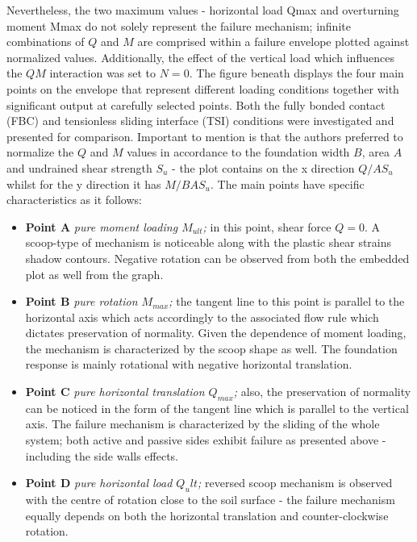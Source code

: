 \documentclass[10pt,a4paper]{report}
\begin{document}
Nevertheless, the two maximum values - horizontal load Qmax and overturning moment Mmax do not solely represent the failure mechanism; infinite combinations of $Q$ and $M$ are comprised within a failure envelope plotted against normalized values. Additionally, the effect of the vertical load which influences the $QM$ interaction was set to $N=0$. The figure beneath displays the four main points on the envelope that represent different loading conditions together with significant output at carefully selected points. Both the fully bonded contact (FBC) and tensionless sliding interface (TSI) conditions were investigated and presented for comparison. Important to mention is that the authors preferred to normalize the $Q$ and $M$ values in accordance to the foundation width $B$, area $A$ and undrained shear strength $S_u$ - the plot contains on the x direction $Q/AS_u$ whilst for the y direction it has $M/BAS_u$. 
The main points have specific characteristics as it follows:
\begin{itemize}
		\item \textbf{Point A} \textit{pure moment loading $M_{ult}$;} in this point, shear force $Q=0$. A scoop-type of mechanism is noticeable along with the plastic shear strains shadow contours. Negative rotation can be observed from both the embedded plot as well from the graph.
	\item\textbf{Point B} \textit{pure rotation $M_{max}$;} the tangent line to this point is parallel to the horizontal axis which acts accordingly to the associated flow rule which dictates preservation of normality. Given the dependence of moment loading, the mechanism is characterized by the scoop shape as well. The foundation response is mainly rotational with negative horizontal translation.  
	\item\textbf{Point C} \textit{pure horizontal translation $Q_{max}$;} also, the preservation of normality can be noticed in the form of the tangent line which is parallel to the vertical axis. The failure mechanism is characterized by the sliding of the whole system; both active and passive sides exhibit failure as presented above - including the side walls effects.
	\item\textbf{Point D} \textit{pure horizontal load $Q_ult$;} reversed scoop mechanism is observed with the centre of rotation close to the soil surface - the failure mechanism equally depends on both the horizontal translation and counter-clockwise rotation.
\end{itemize}
\end{document}
